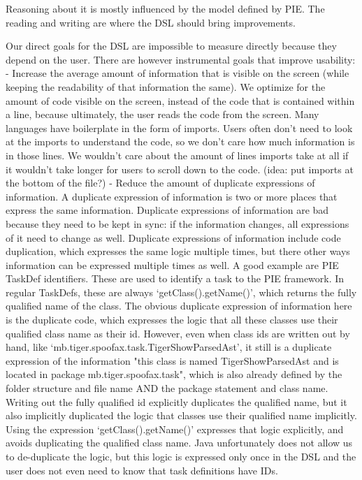 Reasoning about it is mostly influenced by the model defined by PIE.
The reading and writing are where the DSL should bring improvements.


Our direct goals for the DSL are impossible to measure directly because they depend on the user.
There are however instrumental goals that improve usability:
- Increase the average amount of information that is visible on the screen (while keeping the readability of that information the same).
We optimize for the amount of code visible on the screen, instead of the code that is contained within a line, because ultimately, the user reads the code from the screen.
Many languages have boilerplate in the form of imports.
Users often don't need to look at the imports to understand the code, so we don't care how much information is in those lines.
We wouldn't care about the amount of lines imports take at all if it wouldn't take longer for users to scroll down to the code. (idea: put imports at the bottom of the file?)
- Reduce the amount of duplicate expressions of information.
A duplicate expression of information is two or more places that express the same information.
Duplicate expressions of information are bad because they need to be kept in sync: if the information changes, all expressions of it need to change as well.
Duplicate expressions of information include code duplication, which expresses the same logic multiple times, but there other ways information can be expressed multiple times as well.
A good example are PIE TaskDef identifiers.
These are used to identify a task to the PIE framework.
In regular TaskDefs, these are always `getClass().getName()', which returns the fully qualified name of the class.
The obvious duplicate expression of information here is the duplicate code, which expresses the logic that all these classes use their qualified class name as their id.
However, even when class ids are written out by hand, like `mb.tiger.spoofax.task.TigerShowParsedAst', it still is a duplicate expression of the information "this class is named TigerShowParsedAst and is located in package mb.tiger.spoofax.task", which is also already defined by the folder structure and file name AND the package statement and class name.
Writing out the fully qualified id explicitly duplicates the qualified name, but it also implicitly duplicated the logic that classes use their qualified name implicitly.
Using the expression `getClass().getName()' expresses that logic explicitly, and avoids duplicating the qualified class name.
Java unfortunately does not allow us to de-duplicate the logic, but this logic is expressed only once in the DSL and the user does not even need to know that task definitions have IDs.
